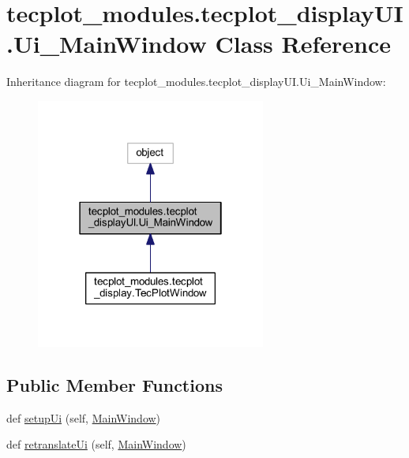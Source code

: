 \hypertarget{a00114}{}\section{tecplot\+\_\+modules.\+tecplot\+\_\+display\+U\+I.\+Ui\+\_\+\+Main\+Window Class Reference}
\label{a00114}


Inheritance diagram for tecplot\+\_\+modules.\+tecplot\+\_\+display\+U\+I.\+Ui\+\_\+\+Main\+Window\+:\nopagebreak
\begin{figure}[H]
\begin{center}
\leavevmode
\includegraphics[width=214pt]{a00113}
\end{center}
\end{figure}
\subsection*{Public Member Functions}
\begin{DoxyCompactItemize}
\item 
def \hyperlink{a00114_a84d83568b72995fc1f091c00044adb72}{setup\+Ui} (self, \hyperlink{a00064_a05b56eca3c779fabf41fa975030e6ca1}{Main\+Window})
\item 
def \hyperlink{a00114_ae1811975426f7bbfcbe9bd6ae8a4d444}{retranslate\+Ui} (self, \hyperlink{a00064_a05b56eca3c779fabf41fa975030e6ca1}{Main\+Window})
\end{DoxyCompactItemize}
